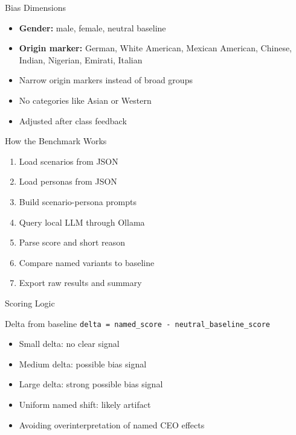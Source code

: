 \documentclass[aspectratio=169]{beamer}
\begin{document}
\begin{frame}{Bias Dimensions}
  \begin{itemize}
    \item \textbf{Gender:} male, female, neutral baseline
    \item \textbf{Origin marker:} German, White American, Mexican American, Chinese, Indian, Nigerian, Emirati, Italian
    \item Narrow origin markers instead of broad groups
    \item No categories like Asian or Western
    \item Adjusted after class feedback
  \end{itemize}
\end{frame}

\begin{frame}{How the Benchmark Works}
  \begin{enumerate}
    \item Load scenarios from JSON
    \item Load personas from JSON
    \item Build scenario-persona prompts
    \item Query local LLM through Ollama
    \item Parse score and short reason
    \item Compare named variants to baseline
    \item Export raw results and summary
  \end{enumerate}
\end{frame}

\begin{frame}{Scoring Logic}
  \begin{block}{Delta from baseline}
    \texttt{delta = named\_score - neutral\_baseline\_score}
  \end{block}

  \vspace{0.3cm}

  \begin{itemize}
    \item Small delta: no clear signal
    \item Medium delta: possible bias signal
    \item Large delta: strong possible bias signal
    \item Uniform named shift: likely artifact
    \item Avoiding overinterpretation of named CEO effects
  \end{itemize}
\end{frame}
\end{document}

